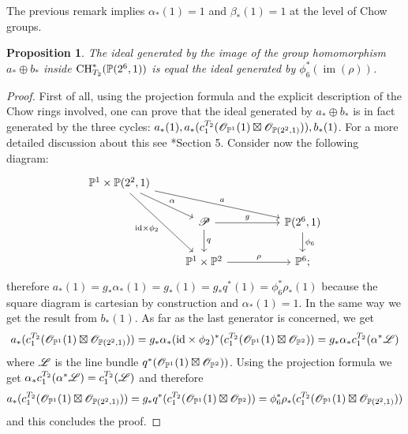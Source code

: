 \documentclass[a4paper, 10pt]{amsart}
\numberwithin{equation}{section}
\numberwithin{subsection}{section}
\newtheorem{proposition}[theorem]{Proposition}
\theoremstyle{definition}
\theoremstyle{remark}
\renewcommand{\mathcal}{\mathscr}
\newcommand\cO{\mathcal{O}} \newcommand\cP{\mathcal{P}}
\newcommand\im[1]{\operatorname{im}(#1)}
\newcommand\id{\mathrm{id}}
\newcommand{\ch}[1][*]{\operatorname{CH}^{#1}}
\begin{document}
	The previous remark implies $\alpha_*(1)=1$ and $\beta_*(1)=1$ at the level of Chow groups.
	\begin{proposition}\label{prop:pullback relations}
		The ideal generated by the image of the group homomorphism $a_*\oplus b_*$ inside $\ch_{T_2}(\PP(2^6,1))$ is equal the ideal generated by $\phi_6^*(\im {\rho})$.
	\end{proposition}
	\begin{proof}
		First of all, using the projection formula and the explicit description of the Chow rings involved, one can prove that the ideal generated by $a_*\oplus b_*$ is in fact generated by the three cycles: $a_*(1),a_*(c_1^{T_2}(\cO_{\PP^1}(1)\boxtimes \cO_{\PP(2^2,1)})),b_*(1)$. For a more detailed discussion about this see \cite{Per}*{Section 5}.
		Consider now the following diagram:
		$$
		\begin{tikzcd}
			{\PP^1 \times \PP(2^2,1)} \arrow[rd, "\alpha"] \arrow[rdd, "\id \times \phi_2"'] \arrow[rrrd, "a"] &                                       &  &                               \\
			& \cP \arrow[rr, "g"] \arrow[d, "q"]    &  & {\PP(2^6,1)} \arrow[d, "\phi_6"] \\
			& \PP^1 \times \PP^2 \arrow[rr, "\rho"] &  & \PP^6;                        
		\end{tikzcd}
		$$
		therefore $a_*(1)=g_*\alpha_*(1)=g_*(1)=g_*q^*(1)=\phi_6^*\rho_*(1)$ because the square diagram is cartesian by construction and $\alpha_*(1)=1$. In the same way we get the result from $b_*(1)$. As far as the last generator is concerned, we get 
		$$ a_*(c_1^{T_2}(\cO_{\PP^1}(1)\boxtimes \cO_{\PP(2^2,1)}))= g_*\alpha_*(\id \times \phi_2)^*(c_1^{T_2}(\cO_{\PP^1}(1) \boxtimes \cO_{\PP^2}))= g_*\alpha_*c_1^{T_2}(\alpha^*\cL)$$
		where $\cL$ is the line bundle $q^*(\cO_{\PP^1}(1) \boxtimes \cO_{\PP^2}))$. Using the projection formula we get $\alpha_*c_1^{T_2}(\alpha^*\cL)=c_1^{T_2}(\cL)$ and therefore 
		$$  a_*(c_1^{T_2}(\cO_{\PP^1}(1)\boxtimes \cO_{\PP(2^2,1)}))=  g_*q^*(c_1^{T_2}(\cO_{\PP^1}(1) \boxtimes \cO_{\PP^2}))=\phi_6^*\rho_*(c_1^{T_2}(\cO_{\PP^1}(1)\boxtimes \cO_{\PP(2^2,1)}))$$
		and this concludes the proof.
	\end{proof}
	
\end{document}
